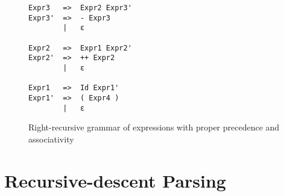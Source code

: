 \documentclass[hidelinks]{uva-inf-article}
\begin{document}
\begin{flushleft}
\begin{figure}[h]
\begin{lstlisting}
Expr3   =>  Expr2 Expr3'
Expr3'  =>  - Expr3
        |   ε

Expr2   =>  Expr1 Expr2'
Expr2'  =>  ++ Expr2
        |   ε

Expr1   =>  Id Expr1'
Expr1'  =>  ( Expr4 )
        |   ε
\end{lstlisting}
\caption{Right-recursive grammar of expressions with proper precedence and associativity}
\label{fig:3}
\end{figure}
\newpage
\section{Recursive-descent Parsing}

\end{flushleft}
\end{document}
